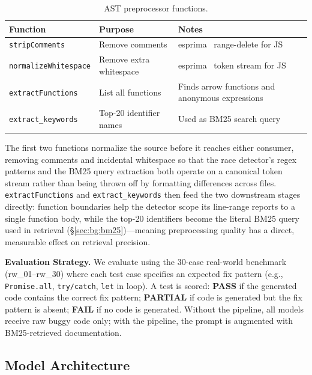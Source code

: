 \documentclass[runningheads]{llncs}
\begin{document}
\begin{table}[H]
  \centering
  \vspace{-0.3cm}
  \caption{AST preprocessor functions.}
  \label{tab:ast}
  \begin{tabular}{@{}llp{5cm}@{}}
    \toprule
    \textbf{Function} & \textbf{Purpose} & \textbf{Notes} \\
    \midrule
    \texttt{stripComments}       & Remove comments        & esprima~\cite{esprima} range-delete for JS \\
    \texttt{normalizeWhitespace} & Remove extra whitespace & esprima~\cite{esprima} token stream for JS \\
    \texttt{extractFunctions}    & List all functions     & Finds arrow functions and anonymous expressions \\
    \texttt{extract\_keywords}   & Top-20 identifier names & Used as BM25 search query \\
    \bottomrule
  \end{tabular}
\end{table}

The first two functions normalize the source before it reaches either
consumer, removing comments and incidental whitespace so that the race
detector's regex patterns and the BM25 query extraction both operate on
a canonical token stream rather than being thrown off by formatting
differences across files.
\texttt{extractFunctions} and \texttt{extract\_keywords} then feed the
two downstream stages directly: function boundaries help the detector
scope its line-range reports to a single function body, while the
top-20 identifiers become the literal BM25 query used in retrieval
(\S\ref{sec:bg:bm25})---meaning preprocessing quality has a direct,
measurable effect on retrieval precision.

\textbf{Evaluation Strategy.}
We evaluate using the 30-case real-world benchmark (rw\_01--rw\_30)
where each test case specifies an expected fix pattern
(e.g., \texttt{Promise.all}, \texttt{try/catch}, \texttt{let} in loop).
A test is scored:
\textbf{PASS} if the generated code contains the correct fix pattern;
\textbf{PARTIAL} if code is generated but the fix pattern is absent;
\textbf{FAIL} if no code is generated.
Without the pipeline, all models receive raw buggy code only;
with the pipeline, the prompt is augmented with BM25-retrieved documentation.

\subsection{Model Architecture}
\label{sec:design:arch}
\end{document}
